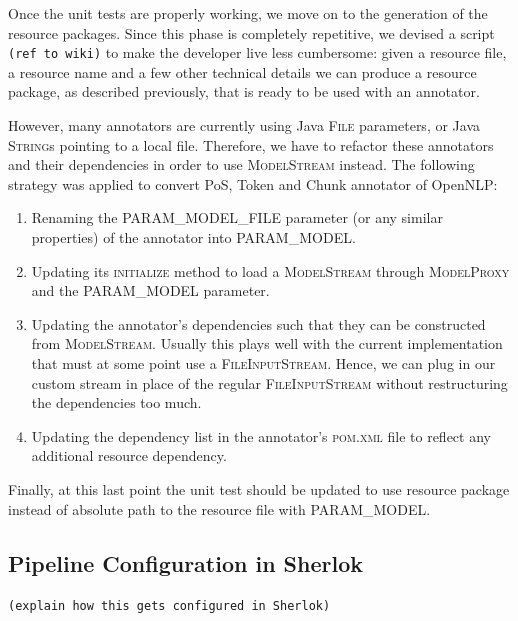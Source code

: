 \documentclass{article}
\newcommand{\ID}[1]{{\textsc{#1}}}
\newcommand{\TODO}[1]{\texttt{\textcolor{YellowOrange}{(#1)}}} %
\begin{document}
\begin{appendices}
Once the unit tests are properly working, we move on to the generation of the resource packages. Since this phase is completely repetitive, we devised a script \TODO{ref to wiki} to make the developer live less cumbersome: given a resource file, a resource name and a few other technical details we can produce a resource package, as described previously, that is ready to be used with an annotator.

However, many annotators are currently using Java \ID{File} parameters, or Java \ID{String}s pointing to a local file. Therefore, we have to refactor these annotators and their dependencies in order to use \ID{ModelStream} instead. The following strategy was applied to convert PoS, Token and Chunk annotator of OpenNLP:

\begin{enumerate}

\item Renaming the \ID{PARAM\_MODEL\_FILE} parameter (or any similar properties) of the annotator into \ID{PARAM\_MODEL}.

\item Updating its \ID{initialize} method to load a \ID{ModelStream} through \ID{ModelProxy} and the \ID{PARAM\_MODEL} parameter.

\item Updating the annotator's dependencies such that they can be constructed from \ID{ModelStream}. Usually this plays well with the current implementation that must at some point use a \ID{FileInputStream}. Hence, we can plug in our custom stream in place of the regular \ID{FileInputStream} without restructuring the dependencies too much.

\item Updating the dependency list in the annotator's \ID{pom.xml} file to reflect any additional resource dependency.

\end{enumerate}

Finally, at this last point the unit test should be updated to use resource package instead of
absolute path to the resource file with \ID{PARAM\_MODEL}.

\subsection{Pipeline Configuration in Sherlok}

\TODO{explain how this gets configured in Sherlok}



\end{appendices}
\end{document}
